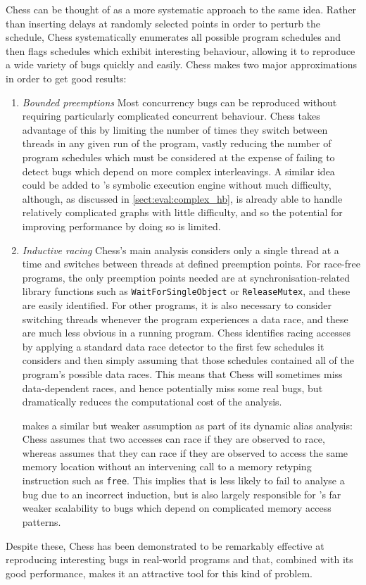 Chess\cite{Musuvathi2008} can be thought of as a more systematic
approach to the same idea.  Rather than inserting delays at randomly
selected points in order to perturb the schedule, Chess systematically
enumerates all possible program schedules and then flags schedules
which exhibit interesting behaviour, allowing it to reproduce a wide
variety of bugs quickly and easily.  Chess makes two major
approximations in order to get good results:
\begin{enumerate}
\item \emph{Bounded preemptions} Most concurrency bugs can be
  reproduced without requiring particularly complicated concurrent
  behaviour\cite{Musuvathi2007}.  Chess takes advantage of this by
  limiting the number of times they switch between threads in any
  given run of the program, vastly reducing the number of program
  schedules which must be considered at the expense of failing to
  detect bugs which depend on more complex interleavings.  A similar
  idea could be added to {\technique}'s symbolic execution engine
  without much difficulty, although, as discussed in
  \autoref{sect:eval:complex_hb}, {\technique} is already able to
  handle relatively complicated graphs with little difficulty, and so
  the potential for improving performance by doing so is limited.
\item \emph{Inductive racing} Chess's main analysis considers only a
  single thread at a time and switches between threads at defined
  preemption points.  For race-free programs, the only preemption
  points needed are at synchronisation-related library functions such
  as \texttt{WaitForSingleObject} or \texttt{ReleaseMutex}, and these
  are easily identified.  For other programs, it is also necessary to
  consider switching threads whenever the program experiences a data
  race, and these are much less obvious in a running program.  Chess
  identifies racing accesses by applying a standard data race detector
  to the first few schedules it considers and then simply assuming
  that those schedules contained all of the program's possible data
  races.  This means that Chess will sometimes miss data-dependent
  races, and hence potentially miss some real bugs, but dramatically
  reduces the computational cost of the analysis.

  {\Technique} makes a similar but weaker assumption as part of its
  dynamic alias analysis: Chess assumes that two accesses can race if
  they are observed to race, whereas {\technique} assumes that they
  can race if they are observed to access the same memory location
  without an intervening call to a memory retyping instruction such as
  \texttt{free}.  This implies that {\technique} is less likely to
  fail to analyse a bug due to an incorrect induction, but is also
  largely responsible for {\technique}'s far weaker scalability to
  bugs which depend on complicated memory access patterns.
\end{enumerate}
Despite these, Chess has been demonstrated to be remarkably effective
at reproducing interesting bugs in real-world programs and that,
combined with its good performance, makes it an attractive tool for
this kind of problem.

